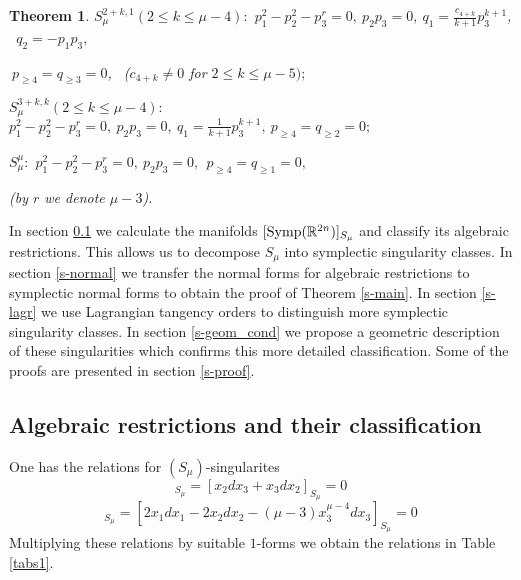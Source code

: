 \documentclass{amsart}
\newtheorem{thm}{Theorem}[section]
\theoremstyle{definition}
\numberwithin{equation}{section}
\begin{document}
\begin{thm}
\smallskip

\noindent $S_{\mu}^{2+k,1} (2\leq k\leq\mu-4):$  $p_1^2-p_2^2-p_3^r=0, \  p_2p_3= 0,  \
q_1=\frac{c_{4+k}}{k+1}p_3^{k+1}$, \ $q_2=-p_1p_3,$ \par  $ \  p_{\ge 4}=q_{\ge 3}=0$, \ ($c_{4+k}\ne 0$  for $ 2\leq k\leq\mu-5);$

\smallskip

\noindent $S_{\mu}^{3+k,k}(2\leq k\leq\mu-4):$  $p_1^2-p_2^2-p_3^r=0, \  p_2p_3=0,  \
q_1=\frac{1}{k+1}p_3^{k+1},  \  p_{\ge 4}=q_{\ge 2}=0;$

\smallskip

\noindent $S_{\mu}^{\mu}:$  $p_1^2-p_2^2-p_3^r=0, \  p_2p_3=0,  \
\  p_{\ge 4}=q_{\ge 1}=0,$

\smallskip

(by $r$ we denote $\mu-3$).

\end{thm}

 In section  \ref{s-class}  we calculate
the manifolds $[{\rm Symp} (\mathbb R^{2n})]_{S_{\mu}}$ and classify its algebraic restrictions. This allows us to decompose $S_{\mu}$ into symplectic singularity classes. In section  \ref{s-normal}  we transfer the normal forms for algebraic restrictions to symplectic normal forms to obtain the
proof of Theorem \ref{s-main}. In section \ref{s-lagr} we use
Lagrangian tangency orders to distinguish more symplectic
singularity classes. In section \ref{s-geom_cond} we propose a
geometric description of these singularities which confirms this
more detailed classification. Some of the proofs are presented in
section \ref{s-proof}.

\subsection{Algebraic restrictions and their classification}\label{s-class}

One has the relations for $(S_{\mu})$-singularites
\begin{equation}
[d(x_2 x_3)]_{S_{\mu}}=[x_2 dx_3+x_3 dx_2]_{S_{\mu}}=0
\label{s1}
\end{equation}
\begin{equation}
[d(x_1^2-x_2^2-x_3^{\mu-3})]_{S_{\mu}}=[2x_1dx_1-2x_2dx_2-(\mu-3)x_3^{\mu-4}dx_3]_{S_{\mu}}=0
\label{s2}
\end{equation}
Multiplying these relations by suitable $1$-forms we obtain the relations in Table \ref{tabs1}.
\end{document}
